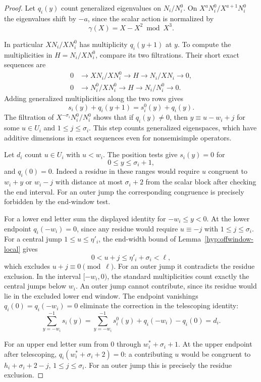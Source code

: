 \begin{proof}
Let \(q_i(y)\) count generalized eigenvalues on \(N_i/N_i^0\).
On \(X^a N_i^0/X^{a+1}N_i^0\) the eigenvalues shift by \(-a\),
since the scalar action is normalized by
\[
 \gamma(X)=X-X^2\bmod X^3.
\]

In particular \(XN_i/XN_i^0\) has multiplicity \(q_i(y+1)\)
at \(y\). To compute the multiplicities in \(H=N_i/XN_i^0\), compare its
two filtrations. Their short exact sequences are
\[
 \begin{aligned}
 0&\longrightarrow XN_i/XN_i^0\longrightarrow H
        \longrightarrow N_i/XN_i\longrightarrow0,\\
 0&\longrightarrow N_i^0/XN_i^0\longrightarrow H
        \longrightarrow N_i/N_i^0\longrightarrow0 .
 \end{aligned}
\]
Adding generalized multiplicities along the two rows gives
\[
 s_i(y)+q_i(y+1)=s_i^0(y)+q_i(y).
\]
The filtration of \(X^{-\sigma_i}N_i^0/N_i^0\) shows that
if \(q_i(y)\ne0\), then \(y\equiv u-w_i+j\) for
some \(u\in U_i\) and \(1\le j\le\sigma_i\).
This step counts generalized eigenspaces, which have additive
dimensions in exact sequences even for nonsemisimple operators.

Let \(d_i\) count \(u\in U_i\) with \(u<w_i\).
The position tests give \(s_i(y)=0\) for
\[
 0\le y\le\sigma_i+1,
\]
and \(q_i(0)=0\).
Indeed a residue in these ranges would require \(u\)
congruent to \(w_i+y\) or \(w_i-j\) with distance
at most \(\sigma_i+2\) from the scalar block after checking
the end interval. For an outer jump the corresponding
congruence is precisely forbidden by the end-window test.

For a lower end letter sum the displayed identity for
\(-w_i\le y<0\). At the lower endpoint \(q_i(-w_i)=0\),
since any residue would require \(u\equiv -j\) with
\(1\le j\le\sigma_i\). For a central jump \(1\le u\le\eta'_i\), the end-width bound of
Lemma~\ref{hyp:offwindow-local} gives
\[
  0<u+j\le\eta'_i+\sigma_i<\ell ,
\]
which excludes \(u+j\equiv0\pmod\ell\). For an outer jump it contradicts
the residue exclusion. In the interval \([-w_i,0)\), the
standard multiplicities count exactly the central jumps below
\(w_i\). An outer jump cannot contribute, since its residue
would lie in the excluded lower end window. The endpoint vanishings \(q_i(0)=q_i(-w_i)=0\)
eliminate the correction in the telescoping identity:
\[
 \sum_{y=-w_i}^{-1}s_i(y)=
   \sum_{y=-w_i}^{-1}s_i^0(y)+q_i(-w_i)-q_i(0)=d_i.
\]

For an upper end letter sum from \(0\) through
\(w_i^*+\sigma_i+1\). At the upper endpoint after telescoping,
\(q_i(w_i^*+\sigma_i+2)=0\): a contributing \(u\) would
be congruent to \(h_i+\sigma_i+2-j\), \(1\le j\le\sigma_i\).
For an outer jump this is precisely the residue exclusion.


\end{proof}
